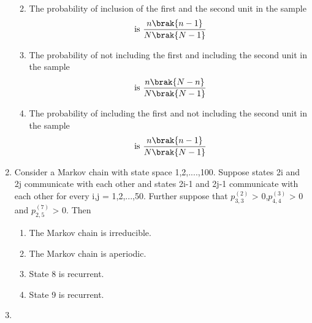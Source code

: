 \begin{enumerate}[label=\thesection.\arabic*.,ref=\thesection.\theenumi]
\begin{enumerate}
\begin{align}
    \end{align}
    \item The probability of inclusion of the first and the second unit in the sample
    \begin{align}
        \text{ is } \frac{n \brak{n-1}}{N \brak{N-1}}
    \end{align}
    \item The probability of not including the first and including the second unit in the sample
    \begin{align}
        \text{ is } \frac{n \brak{N-n}}{N \brak{N-1}}
    \end{align}
    \item The probability of including the first and not including the second unit in the sample
    \begin{align}
        \text{ is } \frac{n \brak{n-1}}{N \brak{N-1}}
    \end{align}
\end{enumerate}
%
\solution

%
\item Consider a Markov chain with state space {1,2,....,100}. Suppose states 2i and 2j communicate with each other and states 2i-1 and 2j-1 communicate with each other for every i,j = 1,2,...,50. Further suppose that $p^{(2)}_{3,3}$ > 0,$p^{(3)}_{4,4}$ > 0 and $p^{(7)}_{2,5}$ > 0. Then 
\begin{enumerate}
\item The Markov chain is irreducible.
\item The Markov chain is aperiodic.
\item State 8 is recurrent.
\item State 9 is recurrent.
\end{enumerate}
%
\solution

%
\item 



\end{enumerate}
